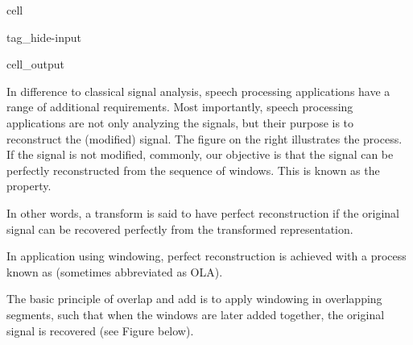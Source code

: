 \documentclass[letterpaper,10pt,english]{jupyterBook}
\begin{document}
\begin{sphinxuseclass}{cell}
\begin{sphinxuseclass}{tag_hide-input}\begin{sphinxVerbatimOutput}

\begin{sphinxuseclass}{cell_output}
\noindent{}

\end{sphinxuseclass}\end{sphinxVerbatimOutput}

\end{sphinxuseclass}
\end{sphinxuseclass}
\sphinxAtStartPar
In difference to classical signal analysis, speech processing
applications have a range of additional requirements. Most importantly,
speech processing applications are not only analyzing the signals, but
their purpose is to reconstruct the (modified) signal. The figure on the
right illustrates the process. If the signal is not modified, commonly,
our objective is that the signal can be perfectly reconstructed from the
sequence of windows. This is known as the 
property.

\sphinxAtStartPar
In other words, a transform is said to have perfect reconstruction if
the original signal can be recovered perfectly from the transformed
representation.

\sphinxAtStartPar
In application using windowing, perfect reconstruction is achieved with
a process known as  (sometimes abbreviated as
OLA). 

\sphinxAtStartPar
The basic principle of overlap and add is to apply windowing in
overlapping segments, such that when the windows are later added
together, the original signal is recovered (see Figure below).

\sphinxAtStartPar
{}
\end{document}
